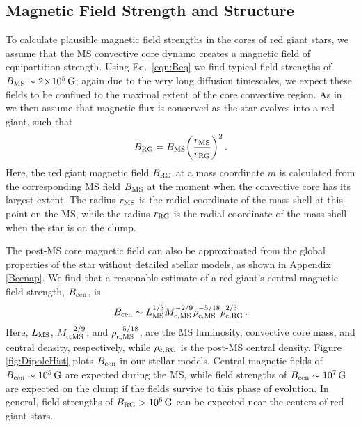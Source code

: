 \subsection{Magnetic Field Strength and Structure}
\label{fieldstruc}

To calculate plausible magnetic field strengths in the cores of red giant stars, we assume that the MS convective core dynamo creates a magnetic field of equipartition strength.
Using Eq.~\ref{eqn:Beq} we find typical field strengths of $B_{\rm MS} \sim 2 \! \times \! 10^5 \, {\rm G}$; again due to the very long diffusion timescales, we expect these fields to be confined to the maximal extent of the core convective region. As in \citet{Fuller_2015} we then assume that magnetic flux is conserved as the star evolves into a red giant, such that
\begin{equation}
\label{eqn:Brgb}
B_{\rm RG} = B_{\rm MS} \bigg( \frac{r_{\rm MS}}{r_{\rm RG}} \bigg)^2 \, .
\end{equation}
Here, the red giant magnetic field $B_{\rm RG}$ at a mass coordinate $m$ is calculated from the corresponding MS field $B_{\rm MS}$ at the moment when the convective core has its largest extent. The radius $r_{\rm MS}$ is the radial coordinate of the mass shell at this point on the MS, while the radius $r_{\rm RG}$ is the radial coordinate of the mass shell when the star is on the clump. 

The post-MS core magnetic field can also be approximated from the global properties of the star without detailed stellar models, as shown in Appendix \ref{Bcenap}. We find that a reasonable estimate of a red giant's central magnetic field strength, $B_{\rm cen}$, is
\begin{equation}
\label{eqn:Bcen}
B_{\rm cen} \sim L_{\rm MS}^{1/3} M_{\rm c,MS}^{-2/9} \rho_{\rm c,MS}^{-5/18} \rho_{\rm c,RG}^{2/3} \, .
\end{equation}
Here, $L_{\rm MS}$, $M_{\rm c,MS}^{-2/9}$, and $\rho_{\rm c,MS}^{-5/18}$, are the MS luminosity, convective core mass, and central density, respectively, while $\rho_{\rm c,RG}$ is the post-MS central density. Figure \ref{fig:DipoleHist} plots $B_{\rm cen}$ in our stellar models. Central magnetic fields of $B_{\rm cen} \sim 10^5 \, {\rm G}$ are expected during the MS, while field strengths of $B_{\rm cen} \sim 10^7 \, {\rm G}$ are expected on the clump if the fields survive to this phase of evolution. In general, field strengths of $B_{\rm RG} > 10^6 \, {\rm G}$ can be expected near the centers of red giant stars.

